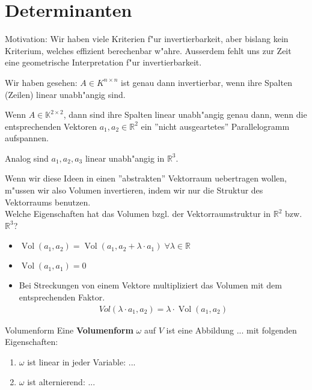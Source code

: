\documentclass[oneside,fontsize=11pt,paper=a4,BCOR=0mm,DIV=12,automark,headsepline]{scrbook}
\DeclareMathOperator{\mVol}{Vol}
\theoremstyle{remark}
\theoremstyle{definition}
\theoremstyle{definition}
\theoremstyle{remark}
\begin{document}
\chapter{Determinanten}
\label{sec:det}

Motivation: Wir haben viele Kriterien f"ur invertierbarkeit, aber bislang kein
Kriterium, welches effizient berechenbar w"ahre. Ausserdem fehlt uns zur Zeit
eine geometrische Interpretation f"ur invertierbarkeit.

\begin{relation}
  \begin{trivlist}
  \item Wir haben gesehen: $A\in K^{n\times n}$ ist genau dann invertierbar, wenn ihre Spalten
    (Zeilen) linear unabh"angig sind.
    
  \item  Wenn $A\in \mathbb{K}^{2\times 2}$, dann sind ihre
    Spalten linear unabh"angig genau dann, wenn die entsprechenden Vektoren $a_1,
    a_2 \in \mathbb{R}^2$ ein ''nicht ausgeartetes'' Parallelogramm aufspannen. \\

  \item Analog sind $a_1, a_2, a_3$ linear unabh"angig in $\mathbb{R}^3$.
  \end{trivlist}
\end{relation}

Wenn wir diese Ideen in einen ''abstrakten'' Vektorraum uebertragen wollen,
m"ussen wir also Volumen invertieren, indem wir nur die Struktur des
Vektorraums benutzen.\\

Welche Eigenschaften hat das Volumen bzgl. der Vektorraumstruktur in
$\mathbb{R}^2$ bzw. $\mathbb{R}^3$?
\begin{itemize}
\item $\mVol(a_1,a_2)=\mVol(a_1, a_2 + \lambda \cdot a_1)\; \forall \lambda \in
  \mathbb{R}$
\item $\mVol(a_1,a_1)=0$
\item Bei Streckungen von einem Vektore multipliziert das Volumen mit dem
  entsprechenden Faktor.
  \begin{align*}
    Vol(\lambda\cdot a_1, a_2)=\lambda\cdot \mVol(a_1,a_2) \tag{$\lambda \geq 0$}
  \end{align*}
\end{itemize}

\begin{definition}{Volumenform}
  Eine \textbf{Volumenform} $\omega$ auf $V$ ist eine Abbildung ... mit
  folgenden Eigenschaften:
  \begin{enumerate}
  \item $\omega$ ist linear in jeder Variable: ...
  \item $\omega$ ist alternierend: ...
  \end{enumerate}
\end{definition}
\end{document}
